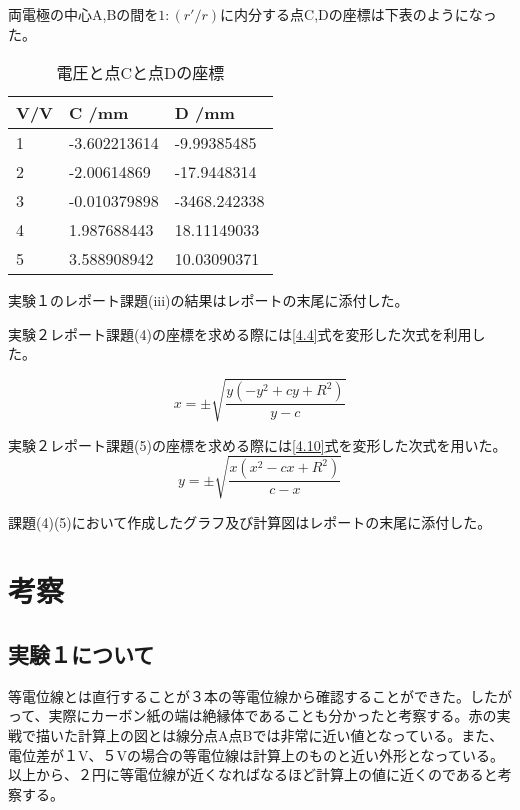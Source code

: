 \documentclass{jsarticle}
\begin{document}
両電極の中心A,Bの間を$1:(r'/r)$に内分する点C,Dの座標は下表のようになった。

\begin{table}[H]
	\centering
	\caption{電圧と点Cと点Dの座標}
	\label{my-label}
	\begin{tabular}{|l|l|l|}
	\hline
	V/V & C /mm            & D /mm           \\ \hline
	1   & -3.602213614 & -9.99385485  \\ \hline
	2   & -2.00614869  & -17.9448314  \\ \hline
	3   & -0.010379898 & -3468.242338 \\ \hline
	4   & 1.987688443  & 18.11149033  \\ \hline
	5   & 3.588908942  & 10.03090371  \\ \hline
	\end{tabular}
	\end{table}

実験１のレポート課題(iii)の結果はレポートの末尾に添付した。\\
\par 実験２レポート課題(4)の座標を求める際には\ref{4.4}式を変形した次式を利用した。

\begin{equation}
\label{4.8}
	x = \pm\sqrt{\frac{y(-y^2+cy+R^2)}{y-c}}
\end{equation}

実験２レポート課題(5)の座標を求める際には\ref{4.10}式を変形した次式を用いた。
\begin{equation}
\label{4.8}
	y = \pm\sqrt{\frac{x(x^2-cx+R^2)}{c-x}}
\end{equation}

課題(4)(5)において作成したグラフ及び計算図はレポートの末尾に添付した。

\section{考察}

\subsection{実験１について}
等電位線とは直行することが３本の等電位線から確認することができた。したがって、実際にカーボン紙の端は絶縁体であることも分かったと考察する。赤の実戦で描いた計算上の図とは線分点A点Bでは非常に近い値となっている。また、電位差が１V、５Vの場合の等電位線は計算上のものと近い外形となっている。以上から、２円に等電位線が近くなればなるほど計算上の値に近くのであると考察する。
\end{document}
